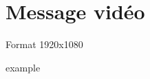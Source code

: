 \documentclass[a4paper]{article}
\begin{document}




\section{Message vidéo}



Format 1920x1080


 example
\end{document}
